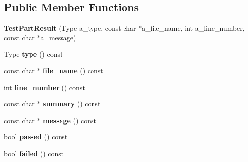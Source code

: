 \subsection*{Public Member Functions}
\begin{DoxyCompactItemize}
\item 
\hypertarget{classtesting_1_1_test_part_result_a6409eb519c1cd514aab2426c8f40737f}{}{\bfseries Test\+Part\+Result} (Type a\+\_\+type, const char $\ast$a\+\_\+file\+\_\+name, int a\+\_\+line\+\_\+number, const char $\ast$a\+\_\+message)\label{classtesting_1_1_test_part_result_a6409eb519c1cd514aab2426c8f40737f}

\item 
\hypertarget{classtesting_1_1_test_part_result_ae852bf8693f066078c74c34345531940}{}Type {\bfseries type} () const \label{classtesting_1_1_test_part_result_ae852bf8693f066078c74c34345531940}

\item 
\hypertarget{classtesting_1_1_test_part_result_a5d8742dc28ddb880cd2391edb9fc2c9b}{}const char $\ast$ {\bfseries file\+\_\+name} () const \label{classtesting_1_1_test_part_result_a5d8742dc28ddb880cd2391edb9fc2c9b}

\item 
\hypertarget{classtesting_1_1_test_part_result_a174900cf4403d23784af34f50e7b0a46}{}int {\bfseries line\+\_\+number} () const \label{classtesting_1_1_test_part_result_a174900cf4403d23784af34f50e7b0a46}

\item 
\hypertarget{classtesting_1_1_test_part_result_af0d4f960b453ce087c581fe13817b2a3}{}const char $\ast$ {\bfseries summary} () const \label{classtesting_1_1_test_part_result_af0d4f960b453ce087c581fe13817b2a3}

\item 
\hypertarget{classtesting_1_1_test_part_result_aae73962246be4d200e2c1d04246a708a}{}const char $\ast$ {\bfseries message} () const \label{classtesting_1_1_test_part_result_aae73962246be4d200e2c1d04246a708a}

\item 
\hypertarget{classtesting_1_1_test_part_result_a901bd62d9fbe7f39826a9d02ab2bdaec}{}bool {\bfseries passed} () const \label{classtesting_1_1_test_part_result_a901bd62d9fbe7f39826a9d02ab2bdaec}

\item 
\hypertarget{classtesting_1_1_test_part_result_aaf835515fb53eb1aa01c1798b05e61f6}{}bool {\bfseries failed} () const \label{classtesting_1_1_test_part_result_aaf835515fb53eb1aa01c1798b05e61f6}


\end{DoxyCompactItemize}
